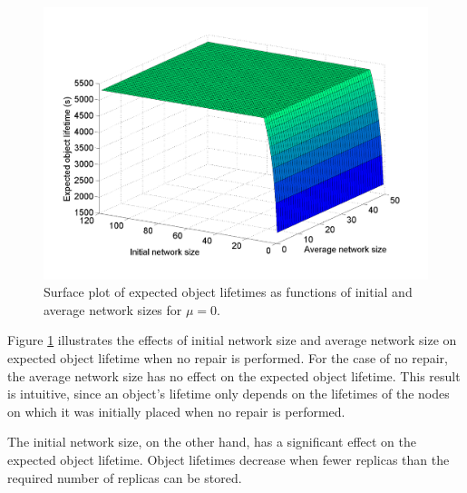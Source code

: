 \documentclass[10pt,a4paper,conference]{IEEEtran}
\begin{document}
\begin{figure}[htbp]
 \centering
 \includegraphics[clip=true, viewport=2.5cm 1.0cm 27.5cm 19.15cm, width=\columnwidth]{lifetime_av_init_groupsize_norep}
 \caption{Surface plot of expected object lifetimes as functions of initial and average network sizes for $\mu = 0$.}
 \label{fig_lifetime_average_vs_initial_norep}
\end{figure}

Figure \ref{fig_lifetime_average_vs_initial_norep} illustrates the effects of initial network size and average network size on expected object lifetime when no repair is performed. For the case of no repair, the average network size has no effect on the expected object lifetime. This result is intuitive, since an object's lifetime only depends on the lifetimes of the nodes on which it was initially placed when no repair is performed.

The initial network size, on the other hand, has a significant effect on the expected object lifetime. Object lifetimes decrease when fewer replicas than the required number of replicas can be stored.
\end{document}
